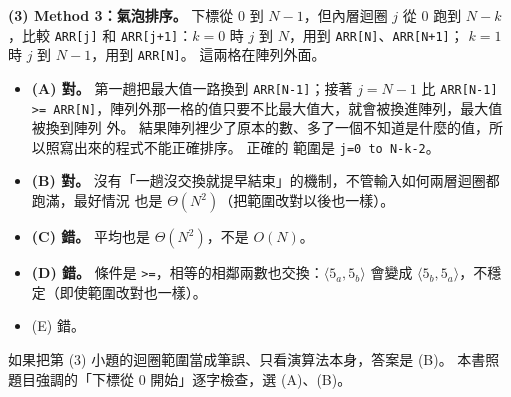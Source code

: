 \begin{pastsoln}
\textbf{(3) Method 3：氣泡排序。} 下標從 $0$ 到 $N - 1$，但內層迴圈 $j$ 從 $0$ 跑到 $N - k$，比較
\texttt{ARR[j]} 和 \texttt{ARR[j+1]}：$k = 0$ 時 $j$ 到 $N$，用到 \texttt{ARR[N]}、\texttt{ARR[N+1]}；
$k = 1$ 時 $j$ 到 $N - 1$，用到 \texttt{ARR[N]}。 這兩格在陣列外面。
\begin{itemize}
\item \textbf{(A) 對。} 第一趟把最大值一路換到 \texttt{ARR[N-1]}；接著 $j = N - 1$ 比
\texttt{ARR[N-1] >= ARR[N]}，陣列外那一格的值只要不比最大值大，就會被換進陣列，最大值被換到陣列
外。 結果陣列裡少了原本的數、多了一個不知道是什麼的值，所以照寫出來的程式不能正確排序。 正確的
範圍是 \texttt{j=0 to N-k-2}。
\item \textbf{(B) 對。} 沒有「一趟沒交換就提早結束」的機制，不管輸入如何兩層迴圈都跑滿，最好情況
也是 $\Theta(N^2)$（把範圍改對以後也一樣）。
\item \textbf{(C) 錯。} 平均也是 $\Theta(N^2)$，不是 $O(N)$。
\item \textbf{(D) 錯。} 條件是 \texttt{>=}，相等的相鄰兩數也交換：$\langle 5_a, 5_b\rangle$ 會變成
$\langle 5_b, 5_a\rangle$，不穩定（即使範圍改對也一樣）。
\item (E) 錯。
\end{itemize}

如果把第 (3) 小題的迴圈範圍當成筆誤、只看演算法本身，答案是 (B)。 本書照題目強調的「下標從 $0$
開始」逐字檢查，選 (A)、(B)。
\end{pastsoln}
